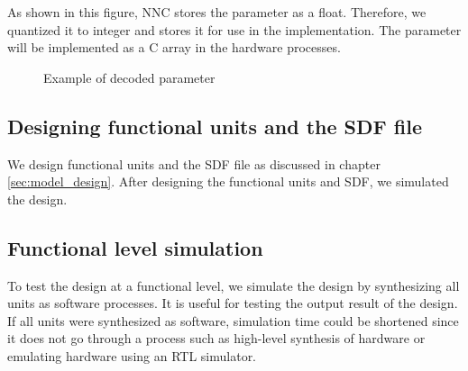 As shown in this figure, NNC stores the parameter as a float. Therefore, we quantized it to integer and stores it for use in the implementation. The parameter will be implemented as a C array in the hardware processes.

\begin{figure}[tbp]
  \centering
  
  \caption{Example of decoded parameter}
  \label{fig:parameter}
\end{figure}


\subsection{Designing functional units and the SDF file}

We design functional units and the SDF file as discussed in chapter \ref{sec:model_design}. After designing the functional units and SDF, we simulated the design.





\subsection{Functional level simulation}
To test the design at a functional level, we simulate the design by synthesizing all units as software processes. It is useful for testing the output result of the design. If all units were synthesized as software, simulation time could be shortened since it does not go through a process such as high-level synthesis of hardware or emulating hardware using an RTL simulator.



